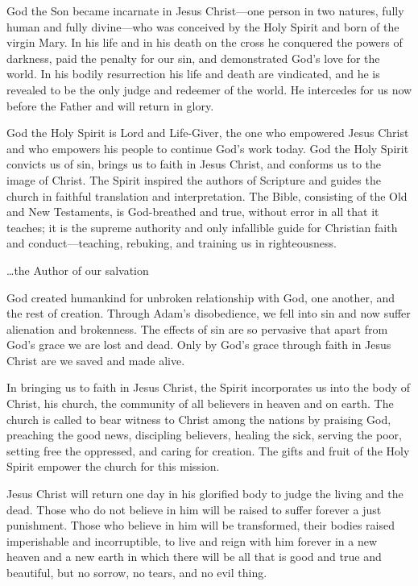 \begin{enumerate}[label=\alph*)]
						\quad God the Son became incarnate in Jesus Christ---one person in two natures, fully human and fully divine---who was conceived by the Holy Spirit and born of the virgin Mary. In his life and in his death on the cross he conquered the powers of darkness, paid the penalty for our sin, and demonstrated God's love for the world.  In his bodily resurrection his life and death are vindicated, and he is revealed to be the only judge and redeemer of the world. He intercedes for us now before the Father and will return in glory.

						\quad God the Holy Spirit is Lord and Life-Giver, the one who empowered Jesus Christ and who empowers his people to continue God's work today. God the Holy Spirit convicts us of sin, brings us to faith in Jesus Christ, and conforms us to the image of Christ. The Spirit inspired the authors of  Scripture and guides the church in faithful translation and interpretation. The Bible, consisting of the Old and New Testaments, is God-breathed and true, without error in all that it teaches; it is the supreme authority and only infallible guide for Christian faith and conduct---teaching, rebuking, and training us in righteousness.

						\quad \dots	the Author of our salvation

						\quad God created humankind for unbroken relationship with God, one another, and the rest of creation. Through Adam's disobedience, we fell into sin and now suffer alienation and brokenness. The effects of sin are so pervasive that apart from God's grace we are lost and dead. Only by God's grace through faith in Jesus Christ are we saved and made alive.

						\quad In bringing us to faith in Jesus Christ, the Spirit incorporates us into the body of Christ, his church, the community of all believers in heaven and on earth. The church is called to bear witness to Christ among the nations by praising God, preaching the good news, discipling believers, healing the sick, serving the poor, setting free the oppressed, and caring for creation. The gifts and fruit of the Holy Spirit empower the church for this mission.

						\quad Jesus Christ will return one day in his glorified body to judge the living and the dead. Those who do not believe in him will be raised to suffer forever a just punishment. Those who believe in him will be transformed, their bodies raised imperishable and incorruptible, to live and reign with him forever in a new heaven and a new earth in which there will be all that is good and true and beautiful, but no sorrow, no tears, and no evil thing.


\end{enumerate}
